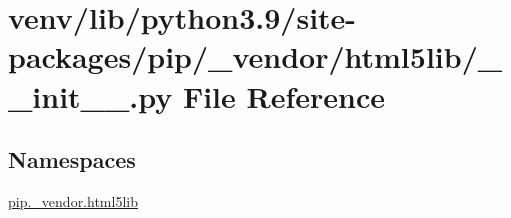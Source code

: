 \hypertarget{venv_2lib_2python3_89_2site-packages_2pip_2__vendor_2html5lib_2____init_____8py}{}\section{venv/lib/python3.9/site-\/packages/pip/\+\_\+vendor/html5lib/\+\_\+\+\_\+init\+\_\+\+\_\+.py File Reference}
\label{venv_2lib_2python3_89_2site-packages_2pip_2__vendor_2html5lib_2____init_____8py}
\subsection*{Namespaces}
\begin{DoxyCompactItemize}
\item 
 \hyperlink{namespacepip_1_1__vendor_1_1html5lib}{pip.\+\_\+vendor.\+html5lib}
\end{DoxyCompactItemize}
